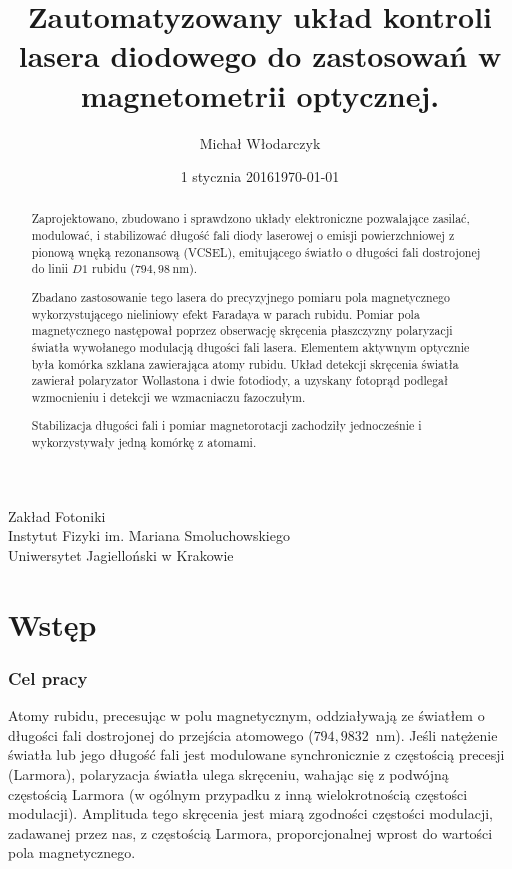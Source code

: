 \documentclass[a4paper,10pt]{article}
\date{1 stycznia 2016}
\title{Zautomatyzowany układ kontroli lasera diodowego do zastosowań w magnetometrii optycznej.}
\author{Michał Włodarczyk}
\date{\footnotesize{\today}}
\begin{document}



\maketitle
\vspace{0.25\textheight}
\begin{large}
\centering
Zakład Fotoniki\\
Instytut Fizyki im. Mariana Smoluchowskiego\\
Uniwersytet Jagielloński w Krakowie\\
\end{large}
\thispagestyle{empty}

\newpage
\tableofcontents
\thispagestyle{plain}
\setcounter{page}{1}
\newpage

\begin{abstract}
Zaprojektowano, zbudowano i sprawdzono układy elektroniczne pozwalające zasilać, modulować, i stabilizować długość fali diody laserowej o emisji powierzchniowej z pionową wnęką rezonansową (VCSEL), emitującego światło o długości fali dostrojonej do linii $D1$ rubidu ($794{,}98~ \mathrm{nm}$).

Zbadano zastosowanie tego lasera do precyzyjnego pomiaru pola magnetycznego wykorzystującego nieliniowy efekt Faradaya w parach rubidu. Pomiar pola magnetycznego następował poprzez obserwację skręcenia płaszczyzny polaryzacji światła wywołanego modulacją długości fali lasera. Elementem aktywnym optycznie była komórka szklana zawierająca atomy rubidu.  Układ detekcji skręcenia światła zawierał polaryzator Wollastona i dwie fotodiody, a uzyskany fotoprąd podlegał wzmocnieniu i detekcji we wzmacniaczu fazoczułym. 

Stabilizacja długości fali i pomiar magnetorotacji zachodziły jednocześnie i wykorzystywały jedną komórkę z atomami.
 
\end{abstract}

\chapter{Wstęp}
\subsection{Cel pracy}



Atomy rubidu, precesując w polu magnetycznym, oddziaływają ze światłem o długości fali dostrojonej do przejścia atomowego ($794{,}9832$~nm).
Jeśli natężenie światła lub jego długość fali jest modulowane synchronicznie z częstością precesji (Larmora), polaryzacja światła ulega skręceniu, wahając się z podwójną częstością Larmora (w ogólnym przypadku z inną wielokrotnością częstości modulacji).
Amplituda tego skręcenia jest miarą zgodności częstości modulacji, zadawanej przez nas, z częstością Larmora, proporcjonalnej wprost do wartości pola magnetycznego. 
\end{document}
